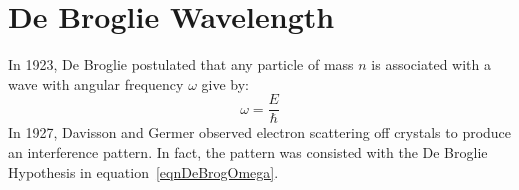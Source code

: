 \documentclass[../Main.tex]{subfiles}
\begin{document}
\section{De Broglie Wavelength}
In 1923, De Broglie postulated that any particle of mass $n$ is associated with a wave with angular frequency $\omega$ give by:
\begin{equation}
    \omega = \frac{E}{\hbar}
    \label{eqnDeBrogOmega}
\end{equation}
In 1927, Davisson and Germer observed electron scattering off crystals to produce an interference pattern. In fact, the pattern was consisted with the De Broglie Hypothesis in equation~\ref{eqnDeBrogOmega}.
\end{document}
